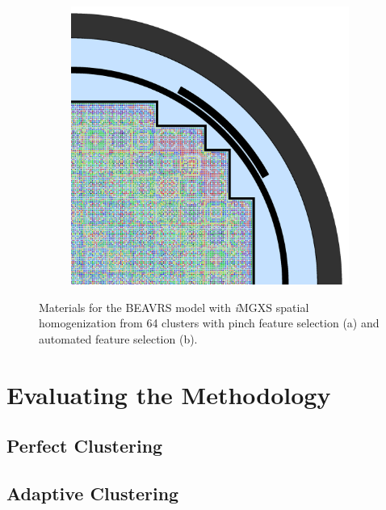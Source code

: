 \begin{figure}[h!]
\begin{subfigure}{0.68\textwidth}
  \includegraphics[width=\linewidth]{figures/unsupervised/geometries/with-features/64-clusters/combined/full-core}
  \caption{}
  \label{fig:chap10-full-core-combined-64}
\end{subfigure}
\caption[Materials for BEAVRS with clustering homogenization (64 clusters)]{Materials for the \ac{BEAVRS} model with \textit{i}\ac{MGXS} spatial homogenization from 64 clusters with pinch feature selection (a) and automated feature selection (b).}
\label{fig:chap10-full-core-geometries-64}
\end{figure}

\clearpage

\section{Evaluating the Methodology}
\label{sec:chap10-cluster}

\subsection{Perfect Clustering}
\label{subsec:chap10-perfect-cluster}

\subsection{Adaptive Clustering}
\label{subsec:chap10-adaptive-cluster}

